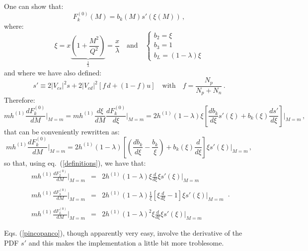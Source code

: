 \documentclass[10pt,a4paper]{article}
\begin{document}
One can show that:
\begin{equation}
F^{(0)}_k(M) = b_k(M)s'(\xi(M))\,,
\end{equation}
where:
\begin{equation}\label{definitions}
\xi = x\underbrace{\left(1+\frac{M^2}{Q^2}\right)}_{\frac1\lambda}=\frac{x}\lambda\quad\mbox{and}\quad
\left\{\begin{array}{l}
b_2 = \xi\\
b_3 = 1\\
b_L = (1-\lambda)\xi
\end{array}
\right.
\end{equation}
and where we have also defined:
\begin{equation}
s'\equiv 2|V_{cs}|^2s+2|V_{cd}|^2[f\,d+(1-f)u]\quad\mbox{with}\quad f=\frac{N_p}{N_p+N_n}\,.
\end{equation}
Therefore:
\begin{equation}\label{pincopanco}
mh^{(1)}\frac{dF^{(0)}_k}{dM}\bigg|_{M=m} = mh^{(1)}\frac{d\xi}{dM}\frac{dF^{(0)}_k}{d\xi}\bigg|_{M=m} = 2h^{(1)}(1-\lambda)\xi\left[\frac{db_k}{d\xi}s'(\xi)+b_k(\xi)\frac{ds'}{d\xi}\right]\bigg|_{M=m}\,,
\end{equation}
that can be conveniently rewritten as:
\begin{equation}
mh^{(1)}\frac{dF^{(0)}_k}{dM}\bigg|_{M=m} = 2h^{(1)}(1-\lambda)\left[\left(\frac{db_k}{d\xi}-\frac{b_k}{\xi}\right)+b_k(\xi)\frac{d}{d\xi}\right]\xi s'(\xi)\bigg|_{M=m}\,,
\end{equation}
so that, using eq.~(\ref{definitions}), we have that:
\begin{equation}
\begin{array}{rcl}
\displaystyle mh^{(1)}\frac{dF^{(0)}_2}{dM}\bigg|_{M=m} &=& \displaystyle
2h^{(1)}(1-\lambda)\xi\frac{d}{d\xi} \xi s'(\xi)\bigg|_{M=m}\\
\\
\displaystyle mh^{(1)}\frac{dF^{(0)}_3}{dM}\bigg|_{M=m} &=& \displaystyle
2h^{(1)}(1-\lambda)\frac{1}{\xi}\left[ \xi\frac{d}{d\xi}-1\right]\xi
s'(\xi)\bigg|_{M=m}\\
\\
\displaystyle mh^{(1)}\frac{dF^{(0)}_L}{dM}\bigg|_{M=m} &=& \displaystyle
2h^{(1)}(1-\lambda)^2\xi \frac{d}{d\xi}\xi s'(\xi)\bigg|_{M=m}
\end{array}\,.
\end{equation}


Eqs. (\ref{pincopanco}), though apparently very easy, involve the derivative of the PDF $s'$ and this makes the implementation a little bit more troblesome.
\end{document}
